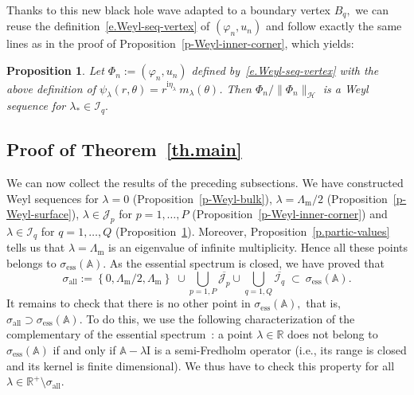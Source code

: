 \documentclass[10pt]{amsart}
\newtheorem{prop}[cdrthm]{Proposition}
\theoremstyle{definition}
\DeclareMathOperator{\ess}{ess}
\DeclareMathOperator{\all}{all}
\newcommand{\calH}{\mathcal{H}}
\newcommand{\calI}{\mathcal{I}}
\newcommand{\calJ}{\mathcal{J}}
\newcommand{\bbA}{\mathbb{A}}
\newcommand{\bbR}{\mathbb{R}}
\newcommand{\rmi}{{\mathrm{i}}}
\newcommand{\Ident}{{\mathrm{I}}}
\newcommand{\Lm}{{\Lambda_{\mathrm{m}}}}
\begin{document}
Thanks to this new black hole wave adapted to a boundary vertex $B_q,$ we can reuse the definition~\eqref{e.Weyl-seq-vertex} of $(\varphi_n,u_n)$ and follow exactly the same lines as in the proof of Proposition~\ref{p-Weyl-inner-corner}, which yields:

\begin{prop}\label{p-Weyl-boundary-corner}
Let $\Phi_n := (\varphi_n,u_n)$ defined by~\eqref{e.Weyl-seq-vertex} with the above definition of $\psi_\lambda(r,\theta) = r^{\rmi\eta_\lambda}\ m_\lambda(\theta)$. Then $\Phi_n/\|\Phi_n\|_\calH$ is a Weyl sequence for $\lambda_* \in \calI_q.$
\end{prop}

\subsection{Proof of Theorem~\ref{th.main}}\label{s.proof-thm}
We can now collect the results of the preceding subsections. We have constructed Weyl sequences for $\lambda = 0$ (Proposition~\ref{p-Weyl-bulk}), $\lambda = \Lm/2$ (Proposition~\ref{p-Weyl-surface}), $\lambda \in \calJ_p$ for $p=1,\ldots,P$ (Proposition~\ref{p-Weyl-inner-corner}) and $\lambda \in \calI_q$ for $q=1,\ldots,Q$ (Proposition~\ref{p-Weyl-boundary-corner}). Moreover, Proposition~\ref{p.partic-values} tells us that $\lambda = \Lm$ is an eigenvalue of infinite multiplicity. Hence all these points belongs to $\sigma_{\ess}(\bbA).$ As the essential spectrum is closed, we have proved that
\[
\sigma_{\all} := \left\{0,\Lm/2,\Lm\right\} \; \cup \bigcup_{p=1,P} \overline{\calJ_p} \cup \bigcup_{q=1,Q} \overline{\calI_q} \; \subset\ \sigma_{\ess}(\bbA).
\]
It remains to check that there is no other point in $\sigma_{\ess}(\bbA),$ that is, $\sigma_{\all} \supset \sigma_{\ess}(\bbA).$ To do this, we use the following characterization of the complementary of the essential spectrum~\cite{Edm-Eva-87}: a point $\lambda \in \bbR$ does not belong to $\sigma_{\ess}(\bbA)$ if and only if $\bbA - \lambda \Ident$ is a semi-Fredholm operator (i.e., its range is closed and its kernel is finite dimensional). We thus have to check this property for all $\lambda \in \bbR^{+}\setminus\sigma_{\all}.$
\end{document}
